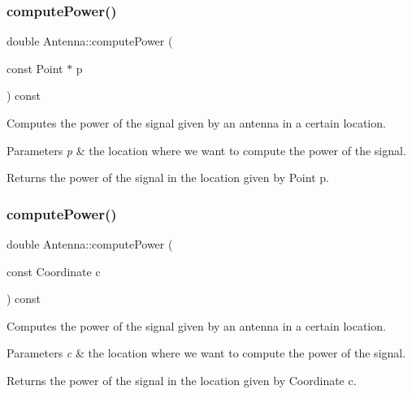 \subsubsection{\texorpdfstring{compute\+Power()}{computePower()}\hspace{0.1cm}{\footnotesize\ttfamily [1/2]}}
{\footnotesize\ttfamily double Antenna\+::compute\+Power (\begin{DoxyParamCaption}\item[{const Point $\ast$}]{p }\end{DoxyParamCaption}) const}

Computes the power of the signal given by an antenna in a certain location. 
\begin{DoxyParams}{Parameters}
{\em p} & the location where we want to compute the power of the signal. \\
\hline
\end{DoxyParams}
\begin{DoxyReturn}{Returns}
the power of the signal in the location given by Point p. 
\end{DoxyReturn}
\mbox{\label{class_antenna_a0192376f8702c5300fe1f13ce267b305}} 
\subsubsection{\texorpdfstring{compute\+Power()}{computePower()}\hspace{0.1cm}{\footnotesize\ttfamily [2/2]}}
{\footnotesize\ttfamily double Antenna\+::compute\+Power (\begin{DoxyParamCaption}\item[{const Coordinate}]{c }\end{DoxyParamCaption}) const}

Computes the power of the signal given by an antenna in a certain location. 
\begin{DoxyParams}{Parameters}
{\em c} & the location where we want to compute the power of the signal. \\
\hline
\end{DoxyParams}
\begin{DoxyReturn}{Returns}
the power of the signal in the location given by Coordinate c. 
\end{DoxyReturn}
\mbox{\label{class_antenna_a2fab50e7dbe01acec58d7fe89798e9b6}} 
